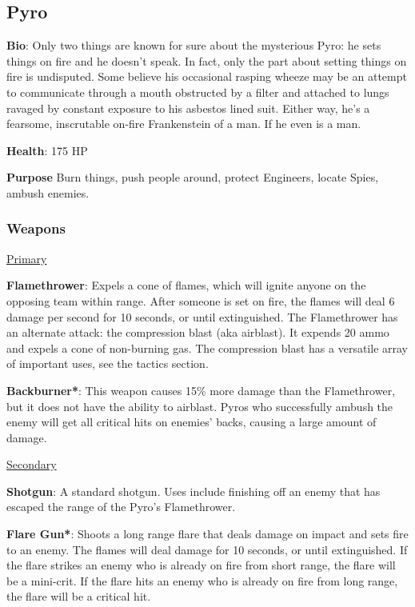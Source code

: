 \subsection{Pyro}
\label{Pyro}
{\bf Bio}:
Only two things are known for sure about the mysterious Pyro: he sets things on fire and he doesn't speak. In fact, only the part about setting things on fire is undisputed. Some believe his occasional rasping wheeze may be an attempt to communicate through a mouth obstructed by a filter and attached to lungs ravaged by constant exposure to his asbestos lined suit. Either way, he's a fearsome, inscrutable on-fire Frankenstein of a man. If he even is a man.

{\bf Health}: 175 HP

{\bf Purpose}
Burn things, push people around, protect Engineers, locate Spies, ambush enemies.

\subsubsection {Weapons}

\begin {center}
\underline {Primary}
\end {center}

{\bf Flamethrower}: Expels a cone of flames, which will ignite anyone on the opposing team within range. After someone is set on fire, the flames will deal 6 damage per second for 10 seconds, or until extinguished. The Flamethrower has an alternate attack: the compression blast (aka airblast). It expends 20 ammo and expels a cone of non-burning gas. The compression blast has a versatile array of important uses, see the tactics section.

{\bf Backburner*}: This weapon causes 15\% more damage than the Flamethrower, but it does not have the ability to airblast. Pyros who successfully ambush the enemy will get all critical hits on enemies' backs, causing a large amount of damage. 


\begin {center}
\underline {Secondary}
\end {center}

{\bf Shotgun}: A standard shotgun. Uses include finishing off an enemy that has escaped the range of the Pyro's Flamethrower.

{\bf Flare Gun*}: Shoots a long range flare that deals damage on impact and sets fire to an enemy. The flames will deal damage for 10 seconds, or until extinguished. If the flare strikes an enemy who is already on fire from short range, the flare will be a mini-crit. If the flare hits an enemy who is already on fire from long range, the flare will be a critical hit.

